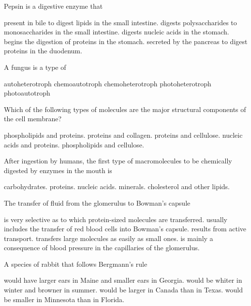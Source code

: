 \newpage

\question
Pepsin is a digestive enzyme that

\begin{choices}
\choice present in bile to digest lipids in the small intestine. 
\choice digests polysaccharides to monosaccharides in the small intestine. 
\choice digests nucleic acids in the stomach. 
\correctchoice begins the digestion of proteins in the stomach. 
\choice secreted by the pancreas to digest proteins in the duodenum. 
\end{choices}

\question
A fungus is a type of 
\begin{choices}
\choice  autoheterotroph 
\choice chemoautotroph 
\correctchoice chemoheterotroph 
\choice  photoheterotroph 
\choice  photoautotroph 
\end{choices}

\question
Which of the following types of molecules are the major structural components of the cell membrane?

\begin{choices}
\correctchoice phospholipids and proteins. 
\choice proteins and collagen. 
\choice proteins and cellulose. 
\choice nucleic acids and proteins. 
\choice phospholipids and cellulose. 
\end{choices}

\question
After ingestion by humans, the first type of macromolecules to be chemically digested by enzymes in the mouth is

\begin{choices}
\correctchoice carbohydrates. 
\choice proteins. 
\choice nucleic acids. 
\choice minerals. 
\choice cholesterol and other lipids. 
\end{choices}

\question
The transfer of fluid from the glomerulus to Bowman's capsule

\begin{choices}
\choice is very selective as to which protein-sized molecules are transferred. 
\choice usually includes the transfer of red blood cells into Bowman's capsule. 
\choice results from active transport. 
\choice transfers large molecules  as easily as small ones. 
\correctchoice  is mainly a consequence of blood pressure in the capillaries of the glomerulus. 
\end{choices}

\question
A species of rabbit that follows Bergmann's rule 

\begin{choices}
\choice would have larger ears in Maine and smaller ears in Georgia. 
\choice would be whiter in winter and browner in summer. 
\correctchoice  would be larger in Canada than in Texas. 
\choice would be smaller in Minnesota than in Florida. 
\end{choices}

